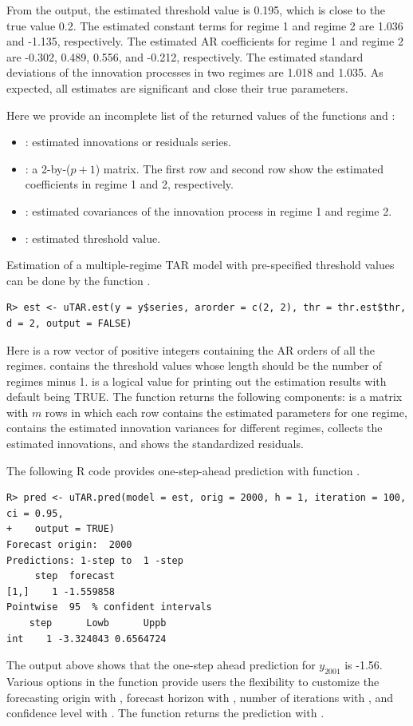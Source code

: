 From the output, the estimated threshold value is 0.195, which is close to the true value 0.2. The estimated constant terms for regime 1 and regime 2 are 1.036 and -1.135, respectively.
The estimated AR coefficients for regime 1 and regime 2 are -0.302, 0.489, 0.556, and -0.212,
respectively.  The estimated standard deviations of the innovation processes in two regimes
are 1.018 and 1.035. As expected, all estimates are significant and close their true parameters.


Here we provide an incomplete list of the returned values of the functions  and :
\begin{itemize}\setlength\itemsep{-0.3em}
\item {}: estimated innovations or residuals series.
\item {}: a 2-by-($p+1$) matrix. The first row and second row show the estimated
coefficients in regime 1 and 2, respectively.
\item {}: estimated covariances of the innovation process in regime 1 and regime 2.
\item {}: estimated threshold value.
\end{itemize}




Estimation of a multiple-regime TAR model with pre-specified threshold values  can be done by the
function . 
\begin{verbatim}
R> est <- uTAR.est(y = y$series, arorder = c(2, 2), thr = thr.est$thr, d = 2, output = FALSE)
\end{verbatim}
Here  is a row vector of positive integers containing the AR orders of all the regimes.  contains the threshold values whose length should be the number of regimes minus 1.  is a logical value for printing out the estimation results with default being TRUE. The function  returns the following components:  is a matrix with $m$ rows in which each row contains the estimated parameters for one regime,  contains the estimated innovation variances for different regimes,  collects the estimated innovations, and  shows the standardized residuals.



The following {R} code provides one-step-ahead prediction with function .
\begin{verbatim}
R> pred <- uTAR.pred(model = est, orig = 2000, h = 1, iteration = 100, ci = 0.95,
+    output = TRUE)
Forecast origin:  2000 
Predictions: 1-step to  1 -step 
     step  forecast
[1,]    1 -1.559858
Pointwise  95  % confident intervals 
    step      Lowb      Uppb
int    1 -3.324043 0.6564724
\end{verbatim}
The output above shows that the one-step ahead prediction for $y_{2001}$ is -1.56. Various options in the function  provide users the flexibility to customize the forecasting origin with , forecast horizon with , number of iterations with , and confidence level with . The function  returns the prediction with . 


